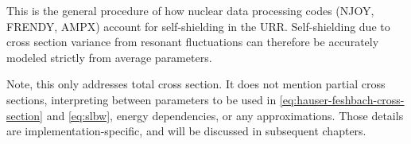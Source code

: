 This is the general procedure of how nuclear data processing codes (NJOY, FRENDY, AMPX) account for self-shielding in the URR. Self-shielding due to cross section variance from resonant fluctuations can therefore be accurately modeled strictly from average parameters.

Note, this only addresses total cross section. It does not mention partial cross sections, interpreting between parameters to be used in \autoref{eq:hauser-feshbach-cross-section} and \autoref{eq:slbw}, energy dependencies, or any approximations. Those details are implementation-specific, and will be discussed in subsequent chapters.
